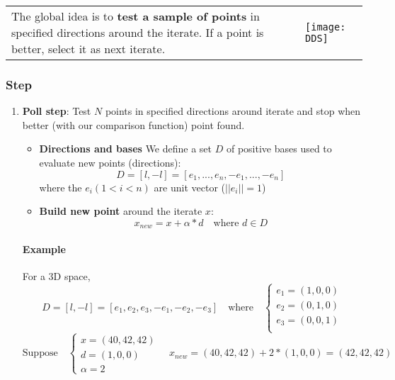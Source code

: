 \begin{tabular}{m{12cm}m{3cm}}
The global idea is to \textbf{test a sample of points} in specified
directions around the iterate.
If a point is better, select it as next iterate.
&
\texttt{[image: DDS]}
\end{tabular}

\subsubsection{Step}

\begin{enumerate}
    \item \textbf{Poll step}: Test $N$ points in specified directions
        around iterate and stop when better (with our comparison
        function) point found.

        \begin{itemize}

            \item \textbf{Directions and bases}
                We define a set $D$ of positive bases used to evaluate new
                points (directions):
                $$D = [l, -l] = [e_1,..., e_n, -e_1,..., -e_n]$$
                where the $e_i (1 < i < n)$ are unit vector ($||e_i|| = 1$)

            \item \textbf{Build new point} around the iterate $x$:
                $$x_{new} = x+\alpha*d \quad \textrm{where } d \in D$$
        \end{itemize}

        \paragraph{Example} For a 3D space,
        $$D = [l, -l] = [e_1, e_2, e_3, -e_1, -e_2, -e_3] \quad
        \textrm{where} \quad \begin{cases}
            e_1 = (1,0,0) \\
            e_2 = (0,1,0)\\
            e_3 = (0,0,1)\\
        \end{cases} $$
        $$\textrm{Suppose} \quad \begin{cases} 
            x = (40, 42, 42)\\
            d = (1, 0, 0)\\
            \alpha =2
        \end{cases} \quad           
        x_{new}  = (40, 42, 42) + 2 * (1, 0, 0) = (42, 42, 42)$$



\end{enumerate}

